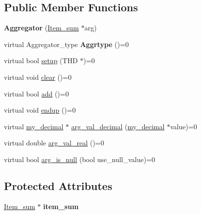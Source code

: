 \subsection*{Public Member Functions}
\begin{DoxyCompactItemize}
\item 
\mbox{\label{classAggregator_ad9419dfc50b0b7e5e977a81b3bd8ddda}} 
{\bfseries Aggregator} (\mbox{\hyperlink{classItem__sum}{Item\+\_\+sum}} $\ast$arg)
\item 
\mbox{\label{classAggregator_aa839d991497a8872e05da159b5ae7970}} 
virtual Aggregator\+\_\+type {\bfseries Aggrtype} ()=0
\item 
virtual bool \mbox{\hyperlink{classAggregator_afcde359558a43054f7812a72498a263f}{setup}} (T\+HD $\ast$)=0
\item 
virtual void \mbox{\hyperlink{classAggregator_ad416a800e9cdec7908dd3e9bdffa70e5}{clear}} ()=0
\item 
virtual bool \mbox{\hyperlink{classAggregator_a70e0d53834f2672f3ec57c96e35a9a60}{add}} ()=0
\item 
virtual void \mbox{\hyperlink{classAggregator_a726ef59a61b219b87c0a6041f8162037}{endup}} ()=0
\item 
virtual \mbox{\hyperlink{classmy__decimal}{my\+\_\+decimal}} $\ast$ \mbox{\hyperlink{classAggregator_a0965a66058cd00c581b015b9c571cb07}{arg\+\_\+val\+\_\+decimal}} (\mbox{\hyperlink{classmy__decimal}{my\+\_\+decimal}} $\ast$value)=0
\item 
virtual double \mbox{\hyperlink{classAggregator_addca16d20f7cc2640f3843c2c5e7596d}{arg\+\_\+val\+\_\+real}} ()=0
\item 
virtual bool \mbox{\hyperlink{classAggregator_a2581c04dee61cf1a4d72519da64baf53}{arg\+\_\+is\+\_\+null}} (bool use\+\_\+null\+\_\+value)=0
\end{DoxyCompactItemize}
\subsection*{Protected Attributes}
\begin{DoxyCompactItemize}
\item 
\mbox{\label{classAggregator_a0c8f75d3d70dff740412d52b63ea3e40}} 
\mbox{\hyperlink{classItem__sum}{Item\+\_\+sum}} $\ast$ {\bfseries item\+\_\+sum}
\end{DoxyCompactItemize}

